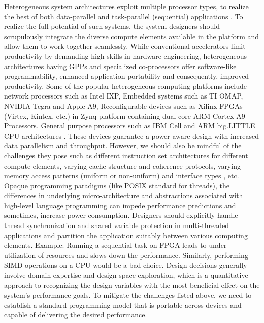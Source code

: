 Heterogeneous system architectures exploit multiple processor types, to realize the best of both data-parallel and task-parallel (sequential) applications \cite{amd_resources}. To realize the full potential of such systems, the system designers should scrupulously integrate the diverse compute elements available in the platform and allow them to work together seamlessly. While conventional accelerators limit productivity by demanding high skills in hardware engineering, heterogeneous architectures having GPPs and specialized co-processors offer software-like programmability, enhanced application portability and consequently, improved productivity. Some of the popular heterogeneous computing platforms include network processors such as Intel IXP, Embedded systems such as TI OMAP, NVIDIA Tegra and Apple A9, Reconfigurable devices such as Xilinx FPGAs (Virtex, Kintex, etc.) in Zynq platform containing dual core ARM Cortex A9 Processors, General purpose processors such as IBM Cell and ARM big.LITTLE CPU architectures \cite{wiki_nanoscale}. \newline \newline 
These devices guarantee a power-aware design with increased data parallelism and throughput. However, we should also be mindful of the challenges they pose such as different instruction set architectures for different compute elements, varying cache structure and coherence protocols, varying memory access patterns (uniform or non-uniform) and interface types \cite{wiki_nanoscale}, etc. Opaque programming paradigms (like POSIX standard for threads), the differences in underlying micro-architecture and abstractions associated with high-level language programming can impede performance predictions and sometimes, increase power consumption. Designers should explicitly handle thread synchronization and shared variable protection in multi-threaded applications and partition the application suitably between various computing elements. Example: Running a sequential task on FPGA leads to under-utilization of resources and slows down the performance. Similarly, performing SIMD operations on a CPU would be a bad choice. Design decisions generally involve domain expertise and design space exploration, which is a quantitative approach to recognizing the design variables with the most beneficial effect on the system’s performance goals. \newline \newline
To mitigate the challenges listed above, we need to establish a standard programming model that is portable across devices and capable of delivering the desired performance. 
